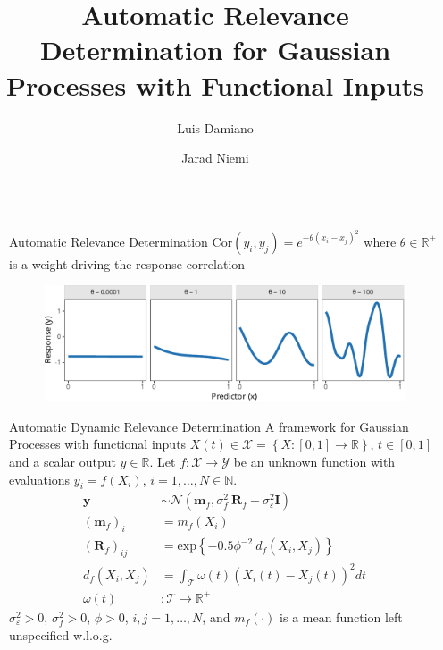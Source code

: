 \documentclass[final]{beamer}
\title{Automatic Relevance Determination
  for Gaussian Processes with Functional Inputs}
\author{
  Luis Damiano \inst{1} \and
  Jarad Niemi \inst{1}}
\institute[Iowa State]{
  \inst{1} Department of Statistics, Iowa State University}
\newlength{\sepwidth}
\newlength{\colwidth}
\newcommand{\separatorcolumn}{\begin{column}{\sepwidth}\end{column}}
\begin{document}
\begin{frame}[t]
\begin{columns}[t]

  \separatorcolumn{}

  \begin{column}{\colwidth}
    \begin{block}{Automatic Relevance Determination}
      $\mathrm{Cor}(y_i, y_j) = e^{-\theta {(x_i - x_j)}^2}$
      where $\theta\in\mathbb{R}^+$ is a weight driving the response correlation

      \begin{figure}
        \centering
        \includegraphics{inc/ard_response_profiles.pdf}
      \end{figure}
    \end{block}

    \begin{block}{Automatic Dynamic Relevance Determination}
      A framework for Gaussian Processes with functional inputs
      $X(t)\in\mathcal{X} = \left\{X:[0,1]\to\mathbb{R}\right\}$, $t\in[0, 1]$
      and a scalar output $y\in\mathbb{R}$. Let $f:\mathcal{X}\to\mathcal{Y}$ be
      an unknown function with evaluations $y_i = f(X_i)$, $i = 1, \dots,
      N\in\mathbb{N}$.
      \begin{align}
        \mathbf{y}
        &\sim \mathcal{N}\left(\mathbf{m}_f, \sigma_{f}^{2} \ \mathbf{R}_f
          + \sigma_{\varepsilon}^{2}\mathbf{I}\right) \\
        (\mathbf{m}_f)_i
        &= m_f(X_i) \\
        {\left(\mathbf{R}_f\right)}_{ij}
        &=
          \text{exp}\left\{
          -0.5 \phi^{-2} \ d_f(X_i, X_j)
          \right\}
        \\
        d_f(X_i, X_j)
        &= \int_{\mathcal{T}}
          \omega(t)
          {\left(X_i(t) - X_j(t) \right)}^2 dt
        \\
        \omega(t)
        &: \mathcal{T}\to\mathbb{R}^+
      \end{align}
      $\sigma_{\varepsilon}^2 > 0$,
      $\sigma_{f}^2 > 0$,
      $\phi > 0$,
      $i, j = 1, \dots, N$,
      and $m_f(\cdot)$ is a mean function left unspecified w.l.o.g.
    \end{block}


\end{column}
\end{columns}
\end{frame}
\end{document}
